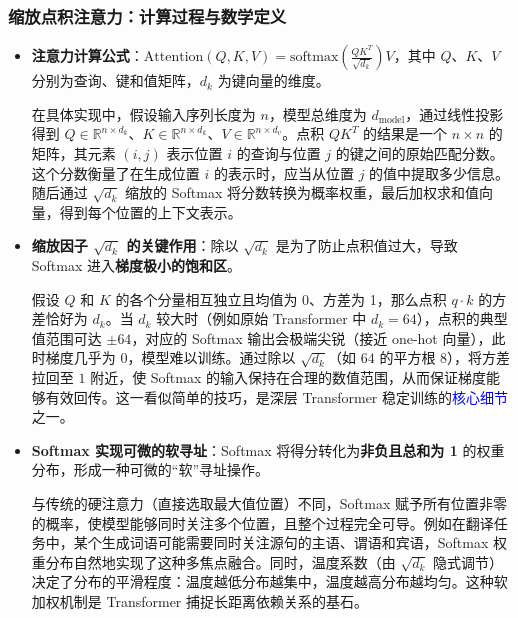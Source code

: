 \documentclass[11pt]{beamer}
\begin{document}
\begin{frame}
\frametitle{缩放点积注意力：计算过程与数学定义}
\begin{itemize}
  \item \textbf{注意力计算公式}：$\text{Attention}(Q,K,V) = \text{softmax}\left(\frac{QK^T}{\sqrt{d_k}}\right)V$，其中 $Q$、$K$、$V$ 分别为查询、键和值矩阵，$d_k$ 为键向量的维度。\par
  在具体实现中，假设输入序列长度为 $n$，模型总维度为 $d_{\text{model}}$，通过线性投影得到 $Q\in\mathbb{R}^{n\times d_k}$、$K\in\mathbb{R}^{n\times d_k}$、$V\in\mathbb{R}^{n\times d_v}$。点积 $QK^T$ 的结果是一个 $n\times n$ 的矩阵，其元素 $(i,j)$ 表示位置 $i$ 的查询与位置 $j$ 的键之间的原始匹配分数。这个分数衡量了在生成位置 $i$ 的表示时，应当从位置 $j$ 的值中提取多少信息。随后通过 $\sqrt{d_k}$ 缩放的 Softmax 将分数转换为概率权重，最后加权求和值向量，得到每个位置的上下文表示。
  
  \item \textbf{缩放因子 $\sqrt{d_k}$ 的关键作用}：除以 $\sqrt{d_k}$ 是为了防止点积值过大，导致 Softmax 进入\textbf{梯度极小的饱和区}。\par
  假设 $Q$ 和 $K$ 的各个分量相互独立且均值为 0、方差为 1，那么点积 $q\cdot k$ 的方差恰好为 $d_k$。当 $d_k$ 较大时（例如原始 Transformer 中 $d_k=64$），点积的典型值范围可达 $\pm 64$，对应的 Softmax 输出会极端尖锐（接近 one-hot 向量），此时梯度几乎为 0，模型难以训练。通过除以 $\sqrt{d_k}$（如 $64$ 的平方根 $8$），将方差拉回至 $1$ 附近，使 Softmax 的输入保持在合理的数值范围，从而保证梯度能够有效回传。这一看似简单的技巧，是深层 Transformer 稳定训练的\textcolor{blue}{核心细节}之一。

  \item \textbf{Softmax 实现可微的软寻址}：Softmax 将得分转化为\textbf{非负且总和为 1} 的权重分布，形成一种可微的“软”寻址操作。\par
  与传统的硬注意力（直接选取最大值位置）不同，Softmax 赋予所有位置非零的概率，使模型能够同时关注多个位置，且整个过程完全可导。例如在翻译任务中，某个生成词语可能需要同时关注源句的主语、谓语和宾语，Softmax 权重分布自然地实现了这种多焦点融合。同时，温度系数（由 $\sqrt{d_k}$ 隐式调节）决定了分布的平滑程度：温度越低分布越集中，温度越高分布越均匀。这种软加权机制是 Transformer 捕捉长距离依赖关系的基石。
\end{itemize}
\end{frame}
\end{document}
